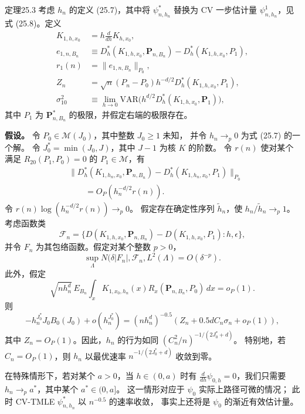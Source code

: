 \begin{bookresult}{定理}{25.3}
考虑 $h_n$ 的定义 (25.7)，其中将 $\psi^*_{n,h_n}$ 替换为
CV 一步估计量 $\psi^1_{n,h_n}$，见式 (25.8)。定义
\[
\begin{aligned}
 K_{1,h,x_0}&=h\frac{d}{dh}K_{h,x_0},\\
 e_{1,n,B_n}&\equiv
 D_h^*(K_{1,h,x_0},\mathbf P_{n,B_n})
 -D_h^*(K_{1,h,x_0},P_1),\\
 r_1(n)&=\|e_{1,n,B_n}\|_{P_0},\\
 Z_n&=\sqrt n(P_n-P_0)h^{-d/2}D_h^*(K_{1,h,x_0},P_1),\\
 \sigma_{10}^2&\equiv\lim_{h\to0}
 \mathrm{VAR}\bigl(h^{d/2}D_h^*(K_{1,h,x_0},\mathbf P_1)\bigr),
\end{aligned}
\]
其中 $P_1$ 为 $\mathbf P^*_{n,B_n}$ 的极限，并假定右端的极限存在。

\noindent\textbf{假设。}\enspace
令 $P_0\in\mathcal M(J_0)$，其中整数 $J_0\geq1$ 未知，
并令 $h_n\to_p0$ 为式 (25.7) 的一个解。
令 $J_0^*=\min(J_0,J)$，其中 $J-1$ 为核 $K$ 的阶数。
令 $r(n)$ 使对某个满足 $R_{20}(P_1,P_0)=0$ 的
$P_1\in\mathcal M$，有
\[
\begin{aligned}
 &\|D_h^*(K_{1,h_n,x_0},\mathbf P_{n,B_n})
 -D_h^*(K_{1,h_n,x_0},P_1)\|_{P_0}\\
 &\qquad=O_P(h_n^{-d/2}r(n)).
\end{aligned}
\]
令 $r(n)\log(h_n^{-d/2}r(n))\to_p0$。
假定存在确定性序列 $\tilde h_n$，使 $h_n/\tilde h_n\to_p1$。
考虑函数类
\[
 \mathcal F_n=\{
 D(K_{1,h,x_0},\mathbf P_{n,B_n})
 -D(K_{1,h,x_0},P_1):h,\epsilon\},
\]
并令 $F_n$ 为其包络函数。假定对某个整数 $p>0$，
\[
 \sup_\Lambda N(\delta|F_n|,\mathcal F_n,L^2(\Lambda)=O(\delta^{-p}).
\]
此外，假定
\begin{equation}
 \sqrt{nh_n^d}\,E_{B_n}\int_x
 K_{1,x_0,h_n}(x)R_x(\mathbf P_{n,B_n},P_0)\,dx=o_P(1).
\tag{25.9}
\end{equation}
则
\[
 -h_n^{J_0^*}J_0B_0(J_0)+o(h_n^{J_0^*})
 =(nh_n^d)^{-0.5}(Z_n+0.5dC_n\sigma_n+o_P(1)),
\]
其中 $Z_n=O_P(1)$。因此，$h_n$ 的行为如同
$(C_n^2/n)^{-1/(2J_0^*+d)}$。
特别地，若 $C_n=O_P(1)$，则 $h_n$ 以最优速率
$n^{-1/(2J_0^*+d)}$ 收敛到零。
\end{bookresult}

在特殊情形下，若对某个 $a>0$，当 $h\in(0,a)$ 时有
$\frac{d}{dh}\psi_{0,h}=0$，我们只需要
$h_n\to_pa^*$，其中某个 $a^*\in(0,a]$。
这一情形对应于 $\psi_0$ 实际上路径可微的情况；
此时 CV-TMLE $\psi^*_{n,h_n}$ 以 $n^{-0.5}$ 的速率收敛，
事实上还将是 $\psi_0$ 的渐近有效估计量。

